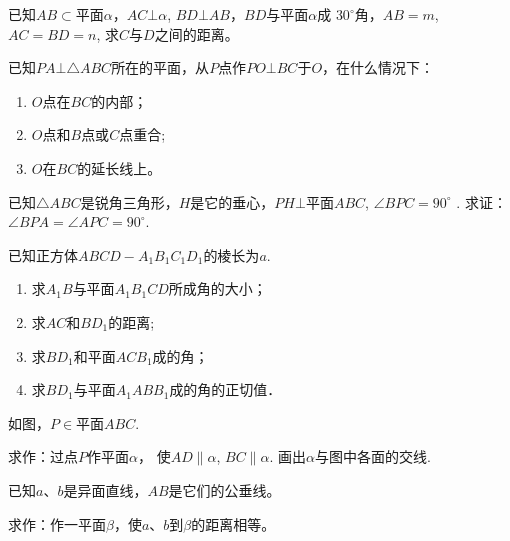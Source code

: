 \begin{enumerate}\setcounter{enumi}{5}
\item 已知$AB\subset $平面$\alpha$，$AC\bot\alpha$, $BD\bot AB$，$BD$与平面$\alpha$成
$30^{\circ}$角，$AB=m$, $AC=BD=n$, 求$C$与$D$之间的距离。
\item 已知$PA\bot \triangle ABC$所在的平面，从$P$点作$PO\bot BC$于$O$，在什么情况下：
\begin{enumerate}[(1)]
\item $O$点在$BC$的内部；
\item $O$点和$B$点或$C$点重合;
\item $O$在$BC$的延长线上。
\end{enumerate}

\item 已知$\triangle ABC$是锐角三角形，$H$是它的垂心，$PH\bot $平面$ABC$, $\angle BPC=90^{\circ}$
. 求证：$\angle BPA=\angle APC=90^{\circ}$.


\noindent
\begin{minipage}{.6\textwidth}
    \item 已知正方体$ABCD-A_1B_1C_1D_1$的棱长为$a$.
    \begin{enumerate}[(1)]
    \item 求$A_1B$与平面$A_1B_1CD$所成角的大小；
    \item 求$AC$和$BD_1$的距离;
    \item 求$BD_1$和平面$ACB_1$成的角；
    \item 求$BD_1$与平面$A_1ABB_1$成的角的正切值．
    \end{enumerate}
\end{minipage}
\hfill
\begin{minipage}{.38\textwidth}
\centering
{}
\end{minipage}

\item 如图，$P\in$平面$ABC$.

求作：过点$P$作平面$\alpha$，
使$AD\parallel \alpha$, $BC\parallel \alpha$. 
画出$\alpha$与图中各面的交线.
\item 已知$a$、$b$是异面直线，$AB$是它们的公垂线。

求作：作一平面$\beta$，使$a$、$b$到$\beta$的距离相等。
\end{enumerate}

